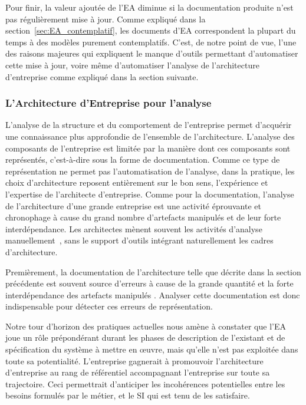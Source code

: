 Pour finir, la valeur ajoutée de l'EA diminue si la documentation produite
n'est pas régulièrement mise à jour. Comme expliqué dans la
section~\ref{sec:EA_contemplatif}, les documents d'EA correspondent la plupart
du temps à des modèles purement contemplatifs. C'est, de notre point de vue,
l'une des raisons majeures qui expliquent le manque d'outils permettant
d'automatiser cette mise à jour, voire même d'automatiser l'analyse de
l'architecture d'entreprise comme expliqué dans la section suivante.

\subsubsection{L'Architecture d'Entreprise pour l'analyse}
\label{sec:EA_analyse_limite}


L'analyse de la structure et du comportement de l'entreprise permet d'acquérir
une connaissance plus approfondie de l'ensemble de l'architecture. L'analyse des
composants de l'entreprise est limitée par la manière dont ces composants sont
représentés, c'est-à-dire sous la forme de documentation. Comme ce type de
représentation ne permet pas l'automatisation de l'analyse, dans la pratique,
les choix d'architecture reposent entièrement sur le bon sens, l'expérience et
l'expertise de l'architecte d'entreprise. Comme pour la documentation, l'analyse
de l'architecture d'une grande entreprise est une activité éprouvante et
chronophage à cause du grand nombre d'artefacts manipulés et de leur forte
interdépendance. Les architectes mènent souvent les activités d'analyse
manuellement~\cite{barn2013enterprise}, sans le support d'outils intégrant
naturellement les cadres d'architecture.

Premièrement, la documentation de l'architecture telle que décrite dans la
section précédente est souvent source d'erreurs à cause de la grande quantité
et la forte interdépendance des artefacts manipulés
\cite{kaisler_enterprise_2005}. Analyser cette documentation est donc
indispensable pour détecter ces erreurs de représentation.

Notre tour d'horizon des pratiques actuelles nous amène à constater que l'EA
joue un rôle prépondérant durant les phases de description de l'existant et de
spécification du système à mettre en œuvre, mais qu'elle n'est pas exploitée
dans toute sa potentialité. L'entreprise gagnerait à promouvoir l'architecture
d'entreprise au rang de référentiel accompagnant l'entreprise sur toute sa
trajectoire. Ceci permettrait d'anticiper les incohérences potentielles entre
les besoins formulés par le métier, et le SI qui est tenu de les satisfaire.

